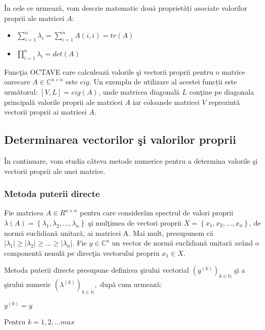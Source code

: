 \documentclass{exam}
\begin{document}
În cele ce urmează, vom descrie matematic două proprietăți asociate valorilor proprii ale matricei $A$:
\begin{itemize}
	\item
	      $\sum\limits_{i=1}^n \lambda_{i}=\sum\limits_{i=1}^n A(i,i)=tr(A)$
	\item
	      $\prod\limits_{i=1}^n \lambda_{i}=det(A)$
\end{itemize}

Funcţia OCTAVE care calculează valorile şi vectorii proprii pentru o matrice oarecare $A\in\mathbb{C}^{n\times n}$ este $eig$. Un exemplu de utilizare al acestei funcții este următorul: $[V, L] = eig(A) $, unde matricea diagonală $L$ conţine pe diagonala principală valorile proprii ale matricei $A$ iar coloanele matricei $V$ reprezintă vectorii proprii ai matricei $A$.

\subsection{Determinarea vectorilor şi valorilor proprii}

În continuare, vom studia câteva metode numerice pentru a determina valorile şi vectorii proprii ale unei matrice.

\subsubsection{Metoda puterii directe}

Fie matricea $A \in R^{n\times n}$ pentru care considerăm spectrul de valori proprii
$\lambda\left( A\right) = \left\lbrace \lambda_{1} , \lambda_{2} , ..., \lambda_{n}\right\rbrace $
şi mulţimea de vectori proprii $X = \left\lbrace  x_{1} , x_{2} , ..., x_{n} \right\rbrace $, de normă euclidiană unitară, ai matricei A. Mai mult, presupunem că $ \vert\lambda_{1}\vert \geq \vert\lambda_{2}\vert \geq ... \geq \vert\lambda_{n}\vert $.
Fie $y \in \mathbb{C}^{n}$ un vector de normă euclidiană unitară având o componentă nenulă pe direcţia vectorului propriu $x_{1} \in X$.

Metoda puterii directe presupune definirea şirului vectorial $ \left(y^{\left( k \right)}\right)_{k \in \mathbb{N}}$  şi a şirului numeric $ \left(\lambda^{\left( k \right)}\right)_{k \in \mathbb{N}},$
după cum urmează:

\hspace{0 mm} $ y^{(0)} = y $

\hspace{0 mm} Pentru $k = 1, 2, ... max$
\end{document}

